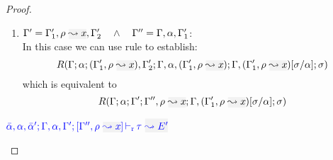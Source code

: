 \begin{proof}
\begin{description}
\begin{enumerate}
  \item $\tenv' = \tenv_1',\ie{\rulet}{x}, \tenv_2' \andl \tenv'' = \tenv,\alpha,\tenv_1'$: \\
  In this case we can use rule  to establish:
\begin{equation*}
  R(\tenv;\alpha;(\tenv_1',\ie{\rulet}{x}),\tenv_2';\tenv,\alpha,(\tenv_1',\ie{\rulet}{x});
  \tenv,(\tenv_1',\ie{\rulet}{x})[\suty/\alpha];\sigma)
\end{equation*}
  which is equivalent to
\begin{equation*}
  R(\tenv;\alpha;\tenv';\tenv'',\ie{\rulet}{x};\tenv,(\tenv_1',\ie{\rulet}{x})[\suty/\alpha];\sigma)
\end{equation*}
  \end{enumerate}

\item[\fbox{\rref{L-RuleNoMatch}}]\quad$\dlres{\bar{\alpha},\alpha,\bar{\alpha}'}{\tenv,\alpha,\tenv'}{\tenv'',\ie{\rulet}{x}}{\type}{E'}$\\


\end{description}
\end{proof}
